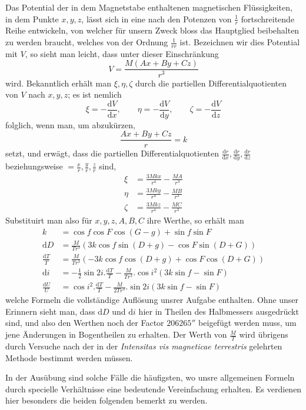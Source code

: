 Das Potential der in dem Magnetstabe enthaltenen magnetischen Flüssigkeiten, in dem Punkte $x,y,z$, lässt sich in eine nach den Potenzen von $\frac1r$ fortschreitende Reihe entwickeln, von welcher für unsern Zweck bloss das Hauptglied beibehalten zu werden braucht, welches von der Ordnung $\frac{1}{rr}$ ist. Bezeichnen wir dies Potential mit $V$, so sieht man leicht, dass unter dieser Einschränkung
\[
V=\frac{M(Ax+By+Cz)}{r^3}
\]
wird. Bekanntlich erhält man $\xi,\eta,\zeta$ durch die partiellen Differentialquotienten von $V$ nach $x,y,z$; es ist nemlich
\[
\xi=-\frac{\mathrm{d}V}{\mathrm{d}x},\qquad\eta=-\frac{\mathrm{d}V}{\mathrm{d}y},\qquad\zeta=-\frac{\mathrm{d}V}{\mathrm{d}z}
\]
folglich, wenn man, um abzukürzen,
\[
\frac{Ax+By+Cz}{r}=k
\]
setzt, und erwägt, dass die partiellen Differentialquotienten $\frac{\mathrm{d}r}{\mathrm{d}x},\frac{\mathrm{d}r}{\mathrm{d}y},\frac{\mathrm{d}r}{\mathrm{d}z}$ beziehungsweise $=\frac{x}{r},\frac{y}{r},\frac{z}{r}$ sind,
\[
\begin{aligned}
\xi&=\frac{3Mkx}{r^4}-\frac{MA}{r^3}\\
\eta&=\frac{3Mky}{r^4}-\frac{MB}{r^3}\\
\zeta&=\frac{3Mkz}{r^4}-\frac{MC}{r^3}
\end{aligned}
\]
Substituirt man also für $x,y,z,A,B,C$ ihre Werthe, so erhält man
\[
\begin{aligned}
k&=\cos f\cos F\cos(G-g)+\sin f\sin F\\
\mathrm{d}D&=\frac{M}{Tr^3}(3k\cos f\sin(D+g)-\cos F\sin(D+G))\\
\frac{\mathrm{d}T}{T}&=\frac{M}{Tr^3}(-3k\cos f\cos(D+g)+\cos F\cos(D+G))\\
\mathrm{d}i&=-\tfrac12\sin2i.\frac{\mathrm{d}T}{T}-\frac{M}{Tr^3}.\cos i^2(3k\sin f-\sin F)\\
\frac{\mathrm{d}U}{U}&=\cos i^2.\frac{\mathrm{d}T}{T}-\frac{M}{2Tr^3}.\sin2i(3k\sin f-\sin F)
\end{aligned}
\]
welche Formeln die vollständige Auflösung unsrer Aufgabe enthalten. Ohne unser Erinnern sieht man, dass $\mathrm{d}D$ und $\mathrm{d}i$ hier in Theilen des Halbmessers ausgedrückt sind, und also den Werthen noch der Factor $206265''$ beigefügt werden muss, um jene Änderungen in Bogentheilen zu erhalten. Der Werth von $\frac{M}{T}$ wird übrigens durch Versuche nach der in der \textit{Intensitas vis magneticae terrestris} gelehrten Methode bestimmt werden müssen.

In der Ausübung sind solche Fälle die häufigsten, wo unsre allgemeinen Formeln durch specielle Verhältnisse eine bedeutende Vereinfachung erhalten. Es verdienen hier besonders die beiden folgenden bemerkt zu werden.

